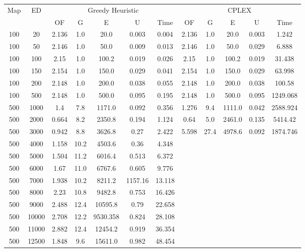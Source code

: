 \begin{table}[htb]
	\centering
	\begin{tabular}{|c|c|c|c|c|c|c|c|c|c|c|c|}
		\hline
		\multirow{2}{*}{Map} & \multirow{2}{*}{ED} & \multicolumn{5}{c|}{Greedy Heuristic} & \multicolumn{5}{c|}{CPLEX}\\ 
		\cline{3-12}
&& OF & G & E & U & Time & OF & G & E & U & Time\\ 
		\hline
		100 & 20 & 2.136 & 1.0 & 20.0 & 0.003 & 0.004 & 2.136 & 1.0 & 20.0 & 0.003 & 1.242 \\ 
		100 & 50 & 2.146 & 1.0 & 50.0 & 0.009 & 0.013 & 2.146 & 1.0 & 50.0 & 0.029 & 6.888 \\ 
		100 & 100 & 2.15 & 1.0 & 100.2 & 0.019 & 0.026 & 2.15 & 1.0 & 100.2 & 0.019 & 31.438 \\ 
		100 & 150 & 2.154 & 1.0 & 150.0 & 0.029 & 0.041 & 2.154 & 1.0 & 150.0 & 0.029 & 63.998 \\ 
		100 & 200 & 2.148 & 1.0 & 200.0 & 0.038 & 0.055 & 2.148 & 1.0 & 200.0 & 0.038 & 100.58 \\ 
		100 & 500 & 2.148 & 1.0 & 500.0 & 0.095 & 0.195 & 2.148 & 1.0 & 500.0 & 0.095 & 1249.068 \\ 
		500 & 1000 & 1.4 & 7.8 & 1171.0 & 0.092 & 0.356 & 1.276 & 9.4 & 1111.0 & 0.042 & 2588.924 \\ 
		500 & 2000 & 0.664 & 8.2 & 2350.8 & 0.194 & 1.124 & 0.64 & 5.0 & 2461.0 & 0.135 & 5414.42 \\ 
		500 & 3000 & 0.942 & 8.8 & 3626.8 & 0.27 & 2.422 & 5.598 & 27.4 & 4978.6 & 0.092 & 1874.746 \\ 
		500 & 4000 & 1.158 & 10.2 & 4503.6 & 0.36 & 4.348 & & & & &  \\ 
		500 & 5000 & 1.504 & 11.2 & 6016.4 & 0.513 & 6.372 & & & & &  \\ 
		500 & 6000 & 1.67 & 11.0 & 6767.6 & 0.605 & 9.776 & & & & &  \\ 
		500 & 7000 & 1.938 & 10.2 & 8211.2 & 1157.16 & 13.118 & & & & &  \\ 
		500 & 8000 & 2.23 & 10.8 & 9482.8 & 0.753 & 16.426 & & & & &  \\ 
		500 & 9000 & 2.488 & 12.4 & 10595.8 & 0.79 & 22.658 & & & & &  \\ 
		500 & 10000 & 2.708 & 12.2 & 9530.358 & 0.824 & 28.108 & & & & &  \\ 
		500 & 11000 & 2.882 & 12.4 & 12454.2 & 0.919 & 36.354 & & & & &  \\ 
		500 & 12500 & 1.848 & 9.6 & 15611.0 & 0.982 & 48.454 & & & & &  \\ 

\end{tabular}
\end{table}
